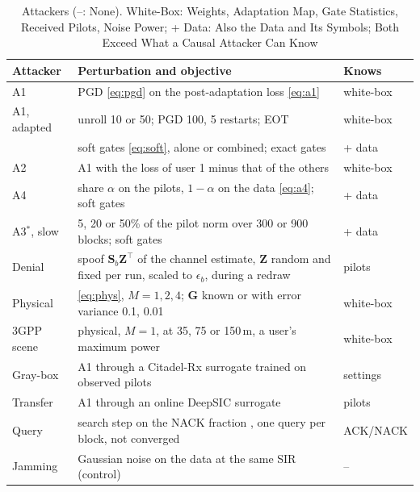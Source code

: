 \documentclass[journal]{IEEEtran}
\theoremstyle{remark}
\begin{document}
\begin{table}[t]
\centering
\caption{Attackers (--: None). White-Box: Weights, Adaptation Map, Gate Statistics, Received Pilots,
Noise Power; + Data: Also the Data and Its Symbols; Both Exceed What a Causal Attacker Can Know}\label{tab:attackers}
\scriptsize
\begin{tabular}{@{}L{13mm}L{56mm}L{14mm}@{}}
\toprule
Attacker & Perturbation and objective & Knows\\
\midrule
A1 \cite{wu2024} & PGD \eqref{eq:pgd} on the post-adaptation loss \eqref{eq:a1} & white-box\\
A1, adapted & unroll 10 or 50; PGD 100, 5 restarts; EOT \cite{athalye2018eot} & white-box\\
 & soft gates \eqref{eq:soft}, alone or combined; exact gates & + data\\
A2 & A1 with the loss of user 1 minus that of the others & white-box\\
A4 & share $\alpha$ on the pilots, $1-\alpha$ on the data \eqref{eq:a4}; soft gates & + data\\
A3$^\ast$, slow & 5, 20 or 50\% of the pilot norm over 300 or 900 blocks; soft gates & + data\\
Denial & spoof $\bm S_b\bm Z^{\!\top}$ of the channel estimate, $\bm Z$ random and fixed per run, scaled to $\epsilon_b$, during a redraw & pilots\\
Physical & \eqref{eq:phys}, $M=1,2,4$; $\bm G$ known or with error variance 0.1, 0.01 & white-box\\
3GPP scene & physical, $M=1$, at 35, 75 or 150\,m, a user's maximum power & white-box\\
Gray-box & A1 through a Citadel-Rx surrogate trained on observed pilots & settings\\
Transfer & A1 through an online DeepSIC surrogate & pilots\\
Query & search step on the NACK fraction \cite{wierstra2014,ilyas2018}, one query per block, not converged & ACK/NACK\\
Jamming & Gaussian noise on the data at the same SIR (control) & --\\
\bottomrule
\end{tabular}
\end{table}
\end{document}
